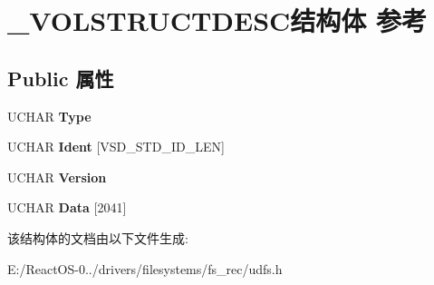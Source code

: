 \hypertarget{struct___v_o_l_s_t_r_u_c_t_d_e_s_c}{}\section{\+\_\+\+V\+O\+L\+S\+T\+R\+U\+C\+T\+D\+E\+S\+C结构体 参考}
\label{struct___v_o_l_s_t_r_u_c_t_d_e_s_c}
\subsection*{Public 属性}
\begin{DoxyCompactItemize}
\item 
\mbox{\label{struct___v_o_l_s_t_r_u_c_t_d_e_s_c_a40fb750e28e8d2d3cf3d5367a0a32102}} 
U\+C\+H\+AR {\bfseries Type}
\item 
\mbox{\label{struct___v_o_l_s_t_r_u_c_t_d_e_s_c_a226997beaf52384466a9fa727a14dfb1}} 
U\+C\+H\+AR {\bfseries Ident} \mbox{[}V\+S\+D\+\_\+\+S\+T\+D\+\_\+\+I\+D\+\_\+\+L\+EN\mbox{]}
\item 
\mbox{\label{struct___v_o_l_s_t_r_u_c_t_d_e_s_c_a05f2435684ad14740f8201eb95afe5db}} 
U\+C\+H\+AR {\bfseries Version}
\item 
\mbox{\label{struct___v_o_l_s_t_r_u_c_t_d_e_s_c_ac9903edf3aa8187ca4ab4ba39b21c122}} 
U\+C\+H\+AR {\bfseries Data} \mbox{[}2041\mbox{]}
\end{DoxyCompactItemize}


该结构体的文档由以下文件生成\+:\begin{DoxyCompactItemize}
\item 
E\+:/\+React\+O\+S-\/0../drivers/filesystems/fs\+\_\+rec/udfs.\+h\end{DoxyCompactItemize}
